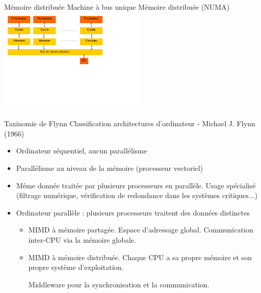 \begin{frame}{Mémoire distribuée}
Machine à bus unique Mémoire distribuée (NUMA)
\includegraphics[height=5cm]{../illustration/para_mem_distri.pdf}
\end{frame}

\begin{frame}{Taxinomie de Flynn \cite{wp-flynn}}
Classification architectures d'ordinateur - Michael J. Flynn (1966)
\begin{itemize}
\item <1->[SISD] Ordinateur séquentiel, aucun parallélisme
\item <2->[SIMD] Parallélisme au niveau de la mémoire (processeur vectoriel)
\item <3->[MISD] Même donnée traitée par plusieurs processeurs en parallèle. Usage spécialisé (filtrage numérique, vérification de redondance dans les systèmes critiques...)
\item <4->[MIMD] Ordinateur parallèle : plusieurs processeurs traitent des données distinctes
\begin{itemize}
\item MIMD à mémoire partagée. Espace d'adressage global. Communication inter-CPU via la mémoire globale.
\item MIMD à mémoire distribuée. Chaque CPU a sa propre mémoire et son propre système d'exploitation.

Middleware pour la synchronisation et la communication.
\end{itemize}
\end{itemize}
\end{frame}


